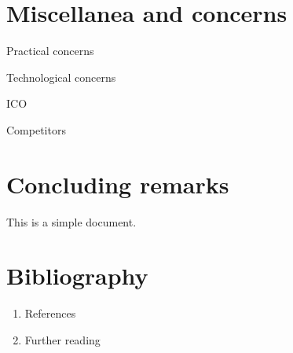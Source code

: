 \documentclass[a4paper,11pt]{article}
\begin{document}
   
\section{Miscellanea and concerns}
   \item Practical concerns
   \item Technological concerns
   \item ICO
   \item Competitors
   \begin{enumerate}
\end{enumerate}
   
   
\section{Concluding remarks}
   \begin{enumerate}
\end{enumerate}
   
   
   This is a simple document.
\section{Bibliography}
   \begin{enumerate}
   \item References
   \item Further reading
\end{enumerate}
   
   
         
\end{document}
